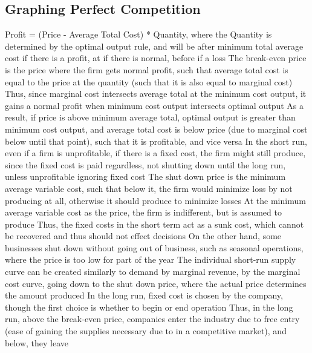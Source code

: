 \documentclass[11 pt, twoside]{article}
\newenvironment{outline*}
{
	\begin{outline}[enumerate]
	}
	{\end{outline}
}
\begin{document}
\subsection{Graphing Perfect Competition}
\begin{outline*}
\1 Profit = (Price - Average Total Cost) * Quantity, where the Quantity is determined by the optimal output rule, and will be after minimum total average cost if there is a profit, at if there is normal, before if a loss
\2 The break-even price is the price where the firm gets normal profit, such that average total cost is equal to the price at the quantity (such that it is also equal to marginal cost)
\3 Thus, since marginal cost intersects average total at the minimum cost output, it gains a normal profit when minimum cost output intersects optimal output
\2 As a result, if price is above minimum average total, optimal output is greater than minimum cost output, and average total cost is below price (due to marginal cost below until that point), such that it is profitable, and vice versa
\1 In the short run, even if a firm is unprofitable, if there is a fixed cost, the firm might still produce, since the fixed cost is paid regardless, not shutting down until the long run, unless unprofitable ignoring fixed cost
\2 The shut down price is the minimum average variable cost, such that below it, the firm would minimize loss by not producing at all, otherwise it should produce to minimize losses
\3 At the minimum average variable cost as the price, the firm is indifferent, but is assumed to produce
\2 Thus, the fixed costs in the short term act as a sunk cost, which cannot be recovered and thus should not effect decisions
\2 On the other hand, some businesses shut down without going out of business, such as seasonal operations, where the price is too low for part of the year
\1 The individual short-run supply curve can be created similarly to demand by marginal revenue, by the marginal cost curve, going down to the shut down price, where the actual price determines the amount produced 
\1 In the long run, fixed cost is chosen by the company, though the first choice is whether to begin or end operation
\2 Thus, in the long run, above the break-even price, companies enter the industry due to free entry (ease of gaining the supplies necessary due to in a competitive market), and below, they leave
\end{outline*}
\end{document}
